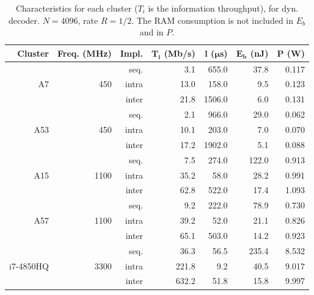 \begin{table}
  \caption{Characteristics for each cluster ($T_i$ is the information
    throughput), for dyn. decoder. $N = 4096$, rate $R = 1/2$. The RAM
    consumption is not included in $E_b$ and in $P$.}
  \label{tab:eval_polar_energy_results}
  \begin{center}
  \begin{tabular}{r r r r r r r}
    \textbf{Cluster} &
    \textbf{Freq. (MHz)} &
    \textbf{Impl.} &
    $\boldsymbol{T_i}$ \textbf{(Mb/s)} &
    $\boldsymbol{l}$   \textbf{($\boldsymbol{\mu}$s)} &
    $\boldsymbol{E_b}$ \textbf{(nJ)} &
    $\boldsymbol{P}$   \textbf{(W)}\\
    \hline
    \hline
    \multirow{3}{*}{A7}        & \multirow{3}{*}{ 450} & seq.  &  3.1 &  655.0 &  37.8 & 0.117 \\
                               &                       & intra & 13.0 &  158.0 &   9.5 & 0.123 \\
                               &                       & inter & 21.8 & 1506.0 &   6.0 & 0.131 \\
    \hline
    \multirow{3}{*}{A53}       & \multirow{3}{*}{ 450} & seq.  &  2.1 &  966.0 &  29.0 & 0.062 \\
                               &                       & intra & 10.1 &  203.0 &   7.0 & 0.070 \\
                               &                       & inter & 17.2 & 1902.0 &   5.1 & 0.088 \\
    \hline
    \multirow{3}{*}{A15}       & \multirow{3}{*}{1100} & seq.  &  7.5 &  274.0 & 122.0 & 0.913 \\
                               &                       & intra & 35.2 &   58.0 &  28.2 & 0.991 \\
                               &                       & inter & 62.8 &  522.0 &  17.4 & 1.093 \\
    \hline
    \multirow{3}{*}{A57}       & \multirow{3}{*}{1100} & seq.  &  9.2 &  222.0 &  78.9 & 0.730 \\
                               &                       & intra & 39.2 &   52.0 &  21.1 & 0.826 \\
                               &                       & inter & 65.1 &  503.0 &  14.2 & 0.923 \\
    \hline
    \multirow{3}{*}{i7-4850HQ} & \multirow{3}{*}{3300} & seq.  &  36.3 &   56.5 & 235.4 & 8.532 \\
                               &                       & intra & 221.8 &    9.2 &  40.5 & 9.017 \\
                               &                       & inter & 632.2 &   51.8 &  15.8 & 9.997 \\
  \end{tabular}
  \end{center}
\end{table}

